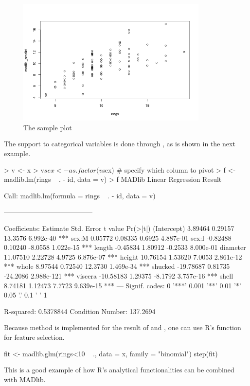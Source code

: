 \begin{figure}[htb]
  \centering
  \includegraphics[width=0.85\textwidth]{sample_plot.png}
  \caption{The sample plot}
  \label{fig:sample}
\end{figure}

The support to categorical variables is done through
, as is shown in the next example.

\begin{example}
> v <- x
> v$sex <- as.factor(v$sex) # specify which column to pivot
> f <- madlib.lm(rings ~ . - id, data = v)
> f
MADlib Linear Regression Result

Call:
madlib.lm(formula = rings ~ . - id, data = v)

---------------------------------------

Coefficients:
             Estimate Std. Error  t value       Pr(>|t|)
(Intercept)   3.89464    0.29157  13.3576  6.992e-40 ***
sex:M         0.05772    0.08335   0.6925  4.887e-01
sex:I        -0.82488    0.10240  -8.0558  1.022e-15 ***
length       -0.45834    1.80912  -0.2533  8.000e-01
diameter     11.07510    2.22728   4.9725  6.876e-07 ***
height       10.76154    1.53620   7.0053  2.861e-12 ***
whole         8.97544    0.72540  12.3730  1.469e-34 ***
shucked     -19.78687    0.81735 -24.2086 2.988e-121 ***
viscera     -10.58183    1.29375  -8.1792  3.757e-16 ***
shell         8.74181    1.12473   7.7723  9.639e-15 ***
---
Signif. codes:  0 '***' 0.001 '**' 0.01 '*' 0.05 '.' 0.1 ' ' 1

R-squared: 0.5378844
Condition Number: 137.2694
\end{example}

Because  method is implemented for the result of
 and , one can use R's 
function for feature selection.
\begin{example}
  fit <- madlib.glm(rings<10 ~ ., data = x, family = "binomial")
  step(fit)
\end{example}
This is a good example of how R's analytical functionalities can be
combined with MADlib.

